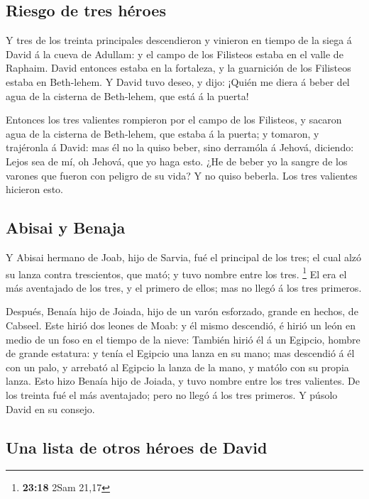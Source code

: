\hypertarget{riesgo-de-tres-huxe9roes}{%
\subsection{Riesgo de tres héroes}\label{riesgo-de-tres-huxe9roes}}

 Y tres de los treinta principales descendieron y
vinieron en tiempo de la siega á David á la cueva de Adullam: y el campo
de los Filisteos estaba en el valle de Raphaim.  David
entonces estaba en la fortaleza, y la guarnición de los Filisteos estaba
en Beth-lehem.  Y David tuvo deseo, y dijo: ¡Quién me
diera á beber del agua de la cisterna de Beth-lehem, que está á la
puerta!

 Entonces los tres valientes rompieron por el campo de
los Filisteos, y sacaron agua de la cisterna de Beth-lehem, que estaba á
la puerta; y tomaron, y trajéronla á David: mas él no la quiso beber,
sino derramóla á Jehová, diciendo:  Lejos sea de mí, oh
Jehová, que yo haga esto. ¿He de beber yo la sangre de los varones que
fueron con peligro de su vida? Y no quiso beberla. Los tres valientes
hicieron esto.

\hypertarget{abisai-y-benaja}{%
\subsection{Abisai y Benaja}\label{abisai-y-benaja}}

 Y Abisai hermano de Joab, hijo de Sarvia, fué el
principal de los tres; el cual alzó su lanza contra trescientos, que
mató; y tuvo nombre entre los tres. \footnote{\textbf{23:18} 2Sam 21,17}
 El era el más aventajado de los tres, y el primero de
ellos; mas no llegó á los tres primeros.

 Después, Benaía hijo de Joiada, hijo de un varón
esforzado, grande en hechos, de Cabseel. Este hirió dos leones de Moab:
y él mismo descendió, é hirió un león en medio de un foso en el tiempo
de la nieve:  También hirió él á un Egipcio, hombre de
grande estatura: y tenía el Egipcio una lanza en su mano; mas descendió
á él con un palo, y arrebató al Egipcio la lanza de la mano, y matólo
con su propia lanza.  Esto hizo Benaía hijo de Joiada, y
tuvo nombre entre los tres valientes.  De los treinta fué
el más aventajado; pero no llegó á los tres primeros. Y púsolo David en
su consejo.

\hypertarget{una-lista-de-otros-huxe9roes-de-david}{%
\subsection{Una lista de otros héroes de
David}\label{una-lista-de-otros-huxe9roes-de-david}}


